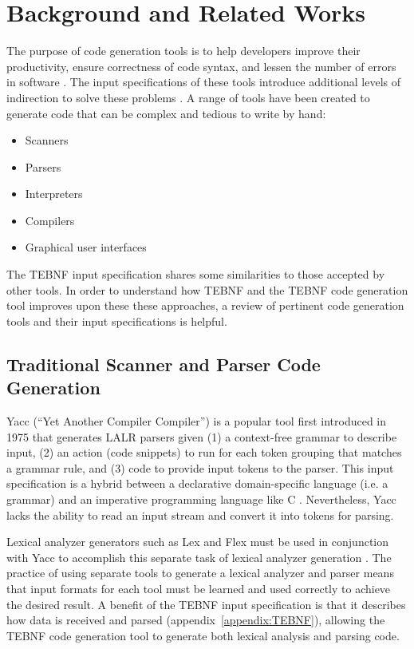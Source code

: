 \chapter{Background and Related Works}
The purpose of code generation tools is to help developers improve their productivity, ensure correctness of code syntax, and lessen the number of errors in software \cite{groher_01}.  The input specifications of these tools introduce additional levels of indirection to solve these problems \cite{spinellis_01}.  A range of tools have been created to generate code that can be complex and tedious to write by hand:
\begin{itemize}
  \item Scanners
  \item Parsers
  \item Interpreters
  \item Compilers
  \item Graphical user interfaces
\end{itemize}

\indent
The TEBNF input specification shares some similarities to those accepted by other tools.  In order to understand how TEBNF and the TEBNF code generation tool improves upon these these approaches, a review of pertinent code generation tools and their input specifications is helpful.

\section{Traditional Scanner and Parser Code Generation}
Yacc (“Yet Another Compiler Compiler”) \cite{johnson_01} is a popular tool first introduced in 1975 that generates LALR parsers given (1) a context-free grammar to describe input, (2) an action (code snippets) to run for each token grouping that matches a grammar rule, and (3) code to provide input tokens to the parser.  This input specification is a hybrid between a declarative domain-specific language (i.e. a grammar) and an imperative programming language like C \cite{demetrescu_01,lloyd_01,gifford_01}.  Nevertheless, Yacc lacks the ability to read an input stream and convert it into tokens for parsing.

\indent
Lexical analyzer generators such as Lex and Flex must be used in conjunction with Yacc to accomplish this separate task of lexical analyzer generation \cite{johnson_01,lesk_01}.  The practice of using separate tools to generate a lexical analyzer and parser means that input formats for each tool must be learned and used correctly to achieve the desired result.  A benefit of the TEBNF input specification  is that it describes how data is received and parsed (appendix~\ref{appendix:TEBNF}), allowing the TEBNF code generation tool to generate both lexical analysis and parsing code.

